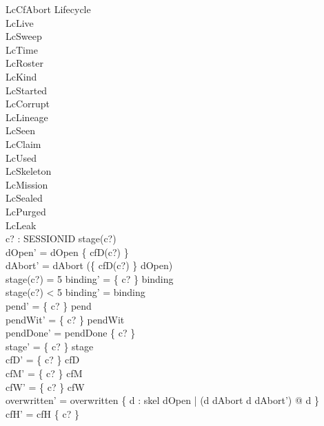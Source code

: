 \documentclass[a4paper,10pt,fleqn]{article}
\begin{document}
\begin{schema}{LcCfAbort}
\Delta Lifecycle \\
\Xi LcLive \\
\Xi LcSweep \\
\Xi LcTime \\
\Xi LcRoster \\
\Xi LcKind \\
\Xi LcStarted \\
\Xi LcCorrupt \\
\Xi LcLineage \\
\Xi LcSeen \\
\Xi LcClaim \\
\Xi LcUsed \\
\Xi LcSkeleton \\
\Xi LcMission \\
\Xi LcSealed \\
\Xi LcPurged \\
\Xi LcLeak \\
c? : SESSIONID
\where
stage(c?)   \\
dOpen' = dOpen \setminus \{ cfD(c?) \} \\
dAbort' = dAbort \cup (\{ cfD(c?) \} \cap dOpen) \\
stage(c?) = 5 \implies binding' = \{ c? \} \ndres binding \\
stage(c?) < 5 \implies binding' = binding \\
pend' = \{ c? \} \ndres pend \\
pendWit' = \{ c? \} \ndres pendWit \\
pendDone' = pendDone \setminus \{ c? \} \\
stage' = \{ c? \} \ndres stage \\
cfD' = \{ c? \} \ndres cfD \\
cfM' = \{ c? \} \ndres cfM \\
cfW' = \{ c? \} \ndres cfW \\
overwritten' = overwritten \cup \{ d : skel \setminus dOpen | (d \in dAbort \iff d \notin dAbort') @ d \} \\
cfH' = cfH \setminus \{ c? \}
\end{schema}
\end{document}
